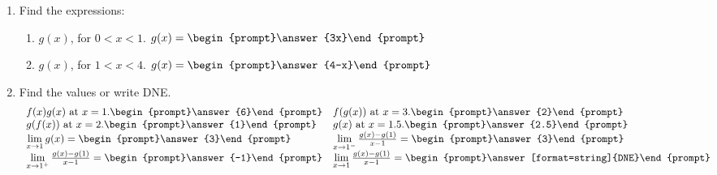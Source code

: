 \documentclass{ximera}
\begin{document}
\begin{exercise}
\begin{enumerate}
\item Find the expressions:
\begin{enumerate}
\item $g(x)$, for $0<x<1$. $g(x)=\begin{prompt}\answer{3x}\end{prompt}$
\item $g(x)$, for $1<x<4$. $g(x)=\begin{prompt}\answer{4-x}\end{prompt}$
\end{enumerate}
\item Find the values or write DNE.
\[
\begin{array}{ l l l}
f(x)g(x) \text{ at } x=1. \begin{prompt}\answer{6}\end{prompt} &
f(g(x)) \text{ at } x=3. \begin{prompt}\answer{2}\end{prompt} \\
g(f(x)) \text{ at } x=2. \begin{prompt}\answer{1}\end{prompt} &
g(x) \text{ at } x=1.5. \begin{prompt}\answer{2.5}\end{prompt} \\
\lim\limits_{x\to 1} g(x)=\begin{prompt}\answer{3}\end{prompt} &
\lim\limits_{x\to 1^-} \frac{g(x)-g(1)}{x-1}=\begin{prompt}\answer{3}\end{prompt}\\
\lim\limits_{x\to 1^+} \frac{g(x)-g(1)}{x-1}=\begin{prompt}\answer{-1}\end{prompt} &
\lim\limits_{x\to 1} \frac{g(x)-g(1)}{x-1}=\begin{prompt}\answer[format=string]{DNE}\end{prompt}
\end{array}
\]
\end{enumerate}
\end{exercise}
\end{document}
